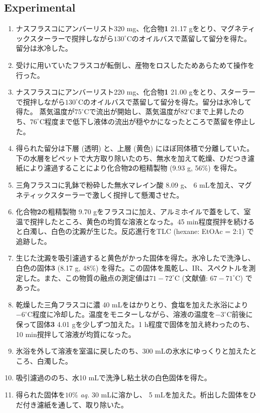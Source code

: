 \documentclass{ltjsarticle}
\theoremstyle{definition}
\numberwithin{equation}{section}
\newcommand{\D}{^\circ\text{C}}
\begin{document}
\subsection{Experimental}
\begin{enumerate}
\item ナスフラスコにアンバーリスト320 mg、化合物\textbf{1} 21.17 gをとり、マグネティックスターラーで撹拌しながら$130\D$のオイルバスで蒸留して留分を得た。留分は氷冷した。
\item 受けに用いていたフラスコが転倒し、産物をロスしたためあらためて操作を行った。
\item ナスフラスコにアンバーリスト220 mg、化合物\textbf{1} 21.00 gをとり、スターラーで撹拌しながら$130\D$のオイルバスで蒸留して留分を得た。留分は氷冷して得た。
蒸気温度が$75\D$で流出が開始し、蒸気温度が$82\D$まで上昇したのち、$76\D$程度まで低下し液体の流出が穏やかになったところで蒸留を停止した。
\item 得られた留分は下層 (透明) と、上層 (黄色) にほぼ同体積で分離していた。下の水層をピペットで大方取り除いたのち、無水を加えて乾燥、ひだつき濾紙により濾過することにより化合物\textbf{2}の粗精製物 (9.93 g, 56\%) を得た。
\item 三角フラスコに乳鉢で粉砕した無水マレイン酸 8.09 g、 6 mLを加え、マグネティックスターラーで激しく撹拌して懸濁させた。
\item 化合物\textbf{2}の粗精製物 9.70 gをフラスコに加え、アルミホイルで蓋をして、室温で撹拌したところ、黄色の均質な溶液となった。45 min程度撹拌を続けると白濁し、白色の沈澱が生じた。反応進行をTLC (hexane: EtOAc = 2:1) で追跡した。
\item 生じた沈澱を吸引濾過すると黄色がかった固体を得た。氷冷したで洗浄し、白色の固体\textbf{3} (8.17 g, 48\%) を得た。この固体を風乾し、IR、スペクトルを測定した。また、この物質の融点の測定値は$71-72\D$ (文献値: $67-71\D$) であった。
\item 乾燥した三角フラスコに濃 40 mLをはかりとり、食塩を加えた氷浴により$-6\D$程度に冷却した。温度をモニターしながら、溶液の温度を$-3\D$前後に保って固体\textbf{3} 4.01 gを少しずつ加えた。1 h程度で固体を加え終わったのち、10 min撹拌して溶液が均質になった。
\item 氷浴を外して溶液を室温に戻したのち、300 mLの氷水にゆっくりと加えたところ、白濁した。
\item 吸引濾過ののち、水10 mLで洗浄し粘土状の白色固体を得た。
\item 得られた固体を$10\%$ \textit{aq.} 30 mLに溶かし、 5 mLを加えた。析出した固体をひだ付き濾紙を通して、取り除いた。

\end{enumerate}
\end{document}
